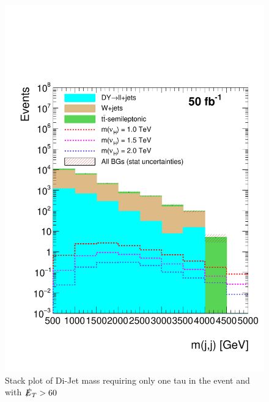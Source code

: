 \begin{figure}
\centering
\includegraphics[width=\linewidth]{StackPlots/mjj_1Tau_met60_50ifb.pdf}
\caption{Stack plot of Di-Jet mass requiring only one tau in the event and with $\slashed{E}_{T} > 60$}
\label{fig: mjj1tauMet60}
\end{figure}

